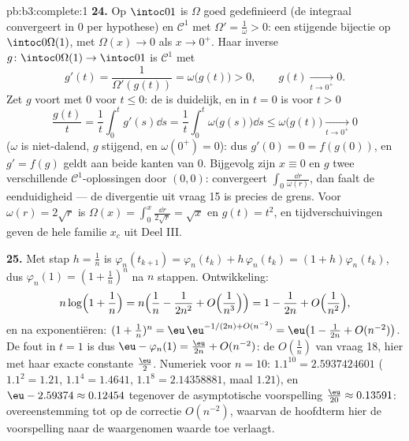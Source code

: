 \begin{solution}{pb:b3:complete:1}
\textbf{24.} Op $\intoc01$ is $\Omega$ goed gedefinieerd (de
integraal convergeert in $0$ per hypothese) en $\mathcal C^1$ met
$\Omega' = \frac1\omega > 0$: een stijgende bijectie op
$\intoc0{\Omega(1)}$, met $\Omega(x) \to 0$ als $x \to 0^+$. Haar
inverse $g \colon \intoc0{\Omega(1)} \to \intoc01$ is $\mathcal
C^1$ met
\[
g'(t) = \frac1{\Omega'(g(t))} = \omega\bigl(g(t)\bigr) > 0,
\qquad g(t) \xrightarrow[t \to 0^+]{} 0 .
\]
Zet $g$ voort met $0$ voor $t \leq 0$: de  is
duidelijk, en in $t = 0$ is voor $t > 0$
\[
\frac{g(t)}t = \frac1t\int_0^tg'(s)\dd s
= \frac1t\int_0^t\omega\bigl(g(s)\bigr)\dd s
\leq \omega\bigl(g(t)\bigr) \xrightarrow[t\to0^+]{} 0
\]
($\omega$ is niet-dalend, $g$ stijgend, en $\omega(0^+) = 0$):
dus $g'(0) = 0 = f(g(0))$, en $g' = f(g)$ geldt aan beide kanten
van $0$. Bijgevolg zijn $x \equiv 0$ en $g$ twee verschillende
$\mathcal C^1$-oplossingen door $(0, 0)$: convergeert
$\int_0\frac{\dd r}{\omega(r)}$, dan faalt de eenduidigheid ---
de divergentie uit vraag 15 is precies de grens. Voor $\omega(r) =
2\sqrt r$ is $\Omega(x) = \int_0^x\frac{\dd r}{2\sqrt r} = \sqrt
x$ en $g(t) = t^2$, en tijdverschuivingen geven de hele familie
$x_c$ uit Deel III.

\textbf{25.} Met stap $h = \frac1n$ is $\varphi_n(t_{k+1}) =
\varphi_n(t_k) + h\,\varphi_n(t_k) = (1 + h)\varphi_n(t_k)$, dus
$\varphi_n(1) = (1 + \frac1n)^n$ na $n$ stappen. Ontwikkeling:
\[
n\log\Bigl(1 + \frac1n\Bigr)
= n\Bigl(\frac1n - \frac1{2n^2} + O\Bigl(\frac1{n^3}\Bigr)
\Bigr) = 1 - \frac1{2n} + O\Bigl(\frac1{n^2}\Bigr),
\]
en na exponentiëren: $(1 + \frac1n)^n = \eu\,\eu^{-1/(2n) +
O(n^{-2})} = \eu\bigl(1 - \frac1{2n} + O(n^{-2})\bigr)$. De fout
in $t = 1$ is dus $\eu - \varphi_n(1) = \frac{\eu}{2n} +
O(n^{-2})$: de $O(\frac1n)$ van vraag 18, hier met haar exacte
constante $\frac\eu2$. Numeriek voor $n = 10$: $1.1^{10} =
2.5937424601$ ($1.1^2 = 1.21$, $1.1^4 = 1.4641$, $1.1^8 =
2.14358881$, maal $1.21$), en $\eu - 2.59374 \approx 0.12454$
tegenover de asymptotische voorspelling $\frac{\eu}{20} \approx
0.13591$: overeenstemming tot op de correctie $O(n^{-2})$, waarvan
de hoofdterm hier de voorspelling naar de waargenomen waarde toe
verlaagt.
\end{solution}
